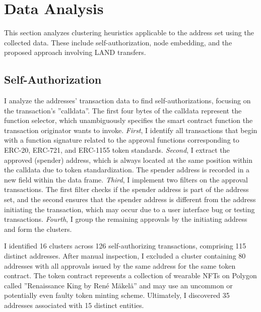 \documentclass[12pt,a4paper,titlepage,oneside,english]{article}
\begin{document}

\section{Data Analysis}
This section analyzes clustering heuristics applicable to the address set using the collected data. These include self-authorization, node embedding, and the proposed approach involving LAND transfers.

\subsection{Self-Authorization}
I analyze the addresses' transaction data to find self-authorizations, focusing on the transaction's ''calldata''. The first four bytes of the calldata represent the function selector, which unambiguously specifies the smart contract function the transaction originator wants to invoke. \newline
\textit{First}, I identify all transactions that begin with a function signature related to the approval functions corresponding to ERC-20, ERC-721, and ERC-1155 token standards. \textit{Second}, I extract the approved (spender) address, which is always located at the same position within the calldata due to token standardization. The spender address is recorded in a new field within the data frame. \textit{Third}, I implement two filters on the approval transactions. The first filter checks if the spender address is part of the address set, and the second ensures that the spender address is different from the address initiating the transaction, which may occur due to a user interface bug or testing transactions. \textit{Fourth}, I group the remaining approvals by the initiating address and form the clusters.

I identified 16 clusters across 126 self-authorizing transactions, comprising 115 distinct addresses. After manual inspection, I excluded a cluster containing 80 addresses with all approvals issued by the same address for the same token contract. The token contract represents a collection of wearable NFTs on Polygon called ''Renaissance King by René Mäkelä'' and may use an uncommon or potentially even faulty token minting scheme. Ultimately, I discovered 35 addresses associated with 15 distinct entities.
\end{document}
